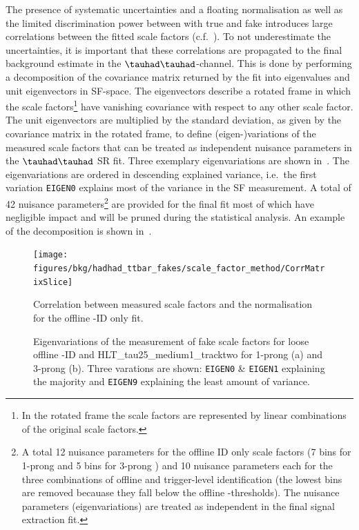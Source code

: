 The presence of systematic uncertainties and a floating \ttbar
normalisation as well as the limited discrimination power between
\ttbar with true and fake \tauhad introduces large correlations
between the fitted scale factors
(c.f.~). To not
underestimate the uncertainties, it is important that these
correlations are propagated to the final background estimate in the
$\tauhad\tauhad$-channel. This is done by performing a decomposition
of the covariance matrix returned by the fit into eigenvalues and unit
eigenvectors in SF-space. The eigenvectors describe a rotated frame in
which the scale factors\footnote{In the rotated frame the scale
  factors are represented by linear combinations of the original scale
  factors.}  have vanishing covariance with respect to any other scale
factor. The unit eigenvectors are multiplied by the standard
deviation, as given by the covariance matrix in the rotated frame, to
define (eigen-)variations of the measured scale factors that can be
treated as independent nuisance parameters in the $\tauhad\tauhad$ SR
fit. Three exemplary eigenvariations are shown
in~. The eigenvariations are
ordered in descending explained variance, i.e.\ the first variation
\texttt{EIGEN0} explains most of the variance in the SF measurement. A
total of 42 nuisance parameters\footnote{A total 12 nuisance
  parameters for the offline ID only scale factors (7 bins for 1-prong
  \tauhad and 5 bins for 3-prong \tauhad) and 10 nuisance parameters
  each for the three combinations of offline and trigger-level \tauhad
  identification (the lowest \pT bins are removed becauase they fall
  below the offline \pT-thresholds). The nuisance parameters
  (eigenvariations) are treated as independent in the final signal
  extraction fit.}  are provided for the final fit most of which have
negligible impact and will be pruned during the statistical
analysis. An example of the decomposition is shown
in~.

\begin{figure}[htbp]
  \centering
  \texttt{[image: figures/bkg/hadhad\_ttbar\_fakes/scale\_factor\_method/CorrMatrixSlice]}
  \caption{Correlation between measured scale factors and the \ttbar
    normalisation for the offline \tauhad-ID only fit.}
  \label{fig:ttbarfake_hadhad_sf_correlation}
\end{figure}

\begin{figure}[htbp]
  \centering
  \caption{Eigenvariations of the measurement of fake \tauhad scale
    factors for loose offline \tauhad-ID and
    HLT\_tau25\_medium1\_tracktwo for 1-prong (a) and 3-prong
    (b). Three varations are shown: \texttt{EIGEN0} \& \texttt{EIGEN1}
    explaining the majority and \texttt{EIGEN9} explaining the least
    amount of variance.}
  \label{fig:ttbar_hadhad_sf_eigenvariations}
\end{figure}

